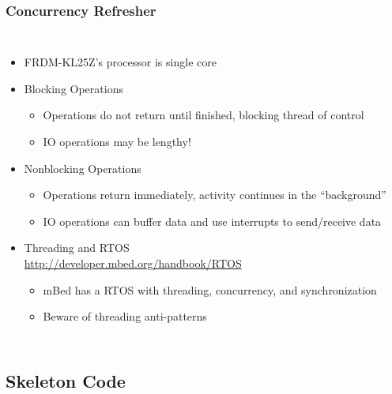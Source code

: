 \documentclass{beamer}
\begin{document}
\begin{frame}
\frametitle{Concurrency Refresher}
\begin{columns}[t]
\begin{itemize}
  \item FRDM-KL25Z's processor is single core
  \item Blocking Operations
  \begin{itemize}
    \item Operations do not return until finished, blocking thread of control
    \item IO operations may be lengthy!
  \end{itemize}
  \item Nonblocking Operations
  \begin{itemize}
    \item Operations return immediately, activity continues in the ``background''
    \item IO operations can buffer data and use interrupts to send/receive data
  \end{itemize}
  \item Threading and RTOS \\
  \tiny{\url{http://developer.mbed.org/handbook/RTOS}}
  \begin{itemize}
    \item mBed has a RTOS with threading, concurrency, and synchronization
    \item Beware of threading anti-patterns
  \end{itemize}
\end{itemize}

\end{columns}
\end{frame}

\subsection{Skeleton Code}
\end{document}
